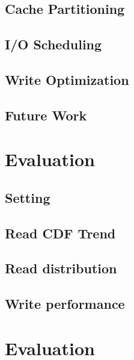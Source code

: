 \documentclass[conference]{IEEEtran}
\begin{document}
\subsection{Cache Partitioning}
\subsection{I/O Scheduling}
\subsection{Write Optimization}
\subsection{Future Work}

\section{Evaluation}
\subsection{Setting}
\subsection{Read CDF Trend}
\subsection{Read distribution}
\subsection{Write performance}

\section{Evaluation}
\end{document}
